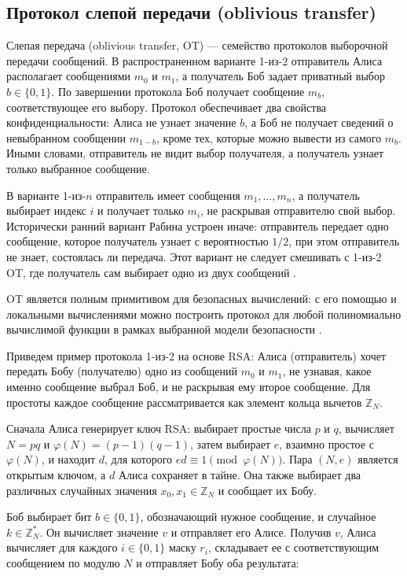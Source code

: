 \subsection{Протокол слепой передачи (oblivious transfer)}
\label{subsec:oblivious-transfer}

Слепая передача (oblivious transfer, OT) --- семейство протоколов выборочной передачи сообщений. В распространенном варианте 1-из-2 отправитель Алиса располагает сообщениями \(m_0\) и \(m_1\), а получатель Боб задает приватный выбор \(b\in\{0,1\}\). По завершении протокола Боб получает сообщение \(m_b\), соответствующее его выбору. Протокол обеспечивает два свойства конфиденциальности: Алиса не узнает значение \(b\), а Боб не получает сведений о невыбранном сообщении \(m_{1-b}\), кроме тех, которые можно вывести из самого \(m_b\). Иными словами, отправитель не видит выбор получателя, а получатель узнает только выбранное сообщение.

В варианте 1-из-\(n\) отправитель имеет сообщения \(m_1,\ldots,m_n\), а получатель выбирает индекс \(i\) и получает только \(m_i\), не раскрывая отправителю свой выбор. Исторически ранний вариант Рабина устроен иначе: отправитель передает одно сообщение, которое получатель узнает с вероятностью \(1/2\), при этом отправитель не знает, состоялась ли передача. Этот вариант не следует смешивать с 1-из-2 OT, где получатель сам выбирает одно из двух сообщений \cite{06}.

OT является полным примитивом для безопасных вычислений: с его помощью и локальными вычислениями можно построить протокол для любой полиномиально вычислимой функции в рамках выбранной модели безопасности \cite{06}.


Приведем пример протокола 1-из-2 на основе RSA: Алиса (отправитель) хочет передать Бобу (получателю) одно из сообщений \(m_0\) и \(m_1\), не узнавая, какое именно сообщение выбрал Боб, и не раскрывая ему второе сообщение. Для простоты каждое сообщение рассматривается как элемент кольца вычетов \(\mathbb{Z}_N\).

Сначала Алиса генерирует ключ RSA: выбирает простые числа \(p\) и \(q\), вычисляет \(N=pq\) и \(\varphi(N)=(p-1)(q-1)\), затем выбирает \(e\), взаимно простое с \(\varphi(N)\), и находит \(d\), для которого \(ed\equiv1\pmod{\varphi(N)}\). Пара \((N,e)\) является открытым ключом, а \(d\) Алиса сохраняет в тайне. Она также выбирает два различных случайных значения \(x_0,x_1\in\mathbb{Z}_N\) и сообщает их Бобу.

Боб выбирает бит \(b\in\{0,1\}\), обозначающий нужное сообщение, и случайное \(k\in\mathbb{Z}_N^*\). Он вычисляет значение \(v\) и отправляет его Алисе. Получив \(v\), Алиса вычисляет для каждого \(i\in\{0,1\}\) маску \(r_i\), складывает ее с соответствующим сообщением по модулю \(N\) и отправляет Бобу оба результата:

